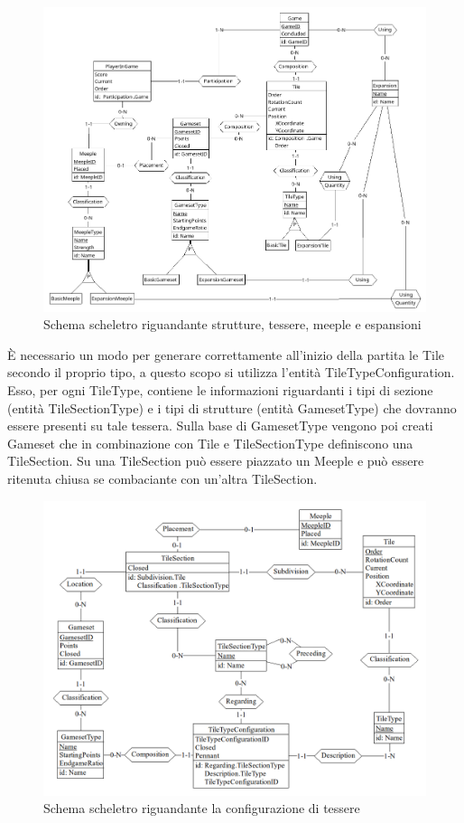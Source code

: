 \begin{figure}[ht]
    \centering\includegraphics[scale=0.4]{images/Progettazione/Concettuale/Scheletro2.png}
    \caption{Schema scheletro riguandante strutture, tessere, meeple e espansioni}
\end{figure}

È necessario un modo per generare correttamente all'inizio della partita le Tile secondo il proprio tipo, a questo scopo si utilizza l'entità TileTypeConfiguration. Esso, per ogni TileType, contiene le informazioni riguardanti i tipi di sezione (entità TileSectionType) e i tipi di strutture (entità GamesetType) che dovranno essere presenti su tale tessera. Sulla base di GamesetType vengono poi creati Gameset che in combinazione con Tile e TileSectionType definiscono una TileSection. Su una TileSection può essere piazzato un Meeple e può essere ritenuta chiusa se combaciante con un'altra TileSection.
\clearpage

\begin{figure}[ht]
    \centering\includegraphics[scale=0.3]{images/Progettazione/Concettuale/Scheletro3.png}
    \caption{Schema scheletro riguandante la configurazione di tessere}
\end{figure}


